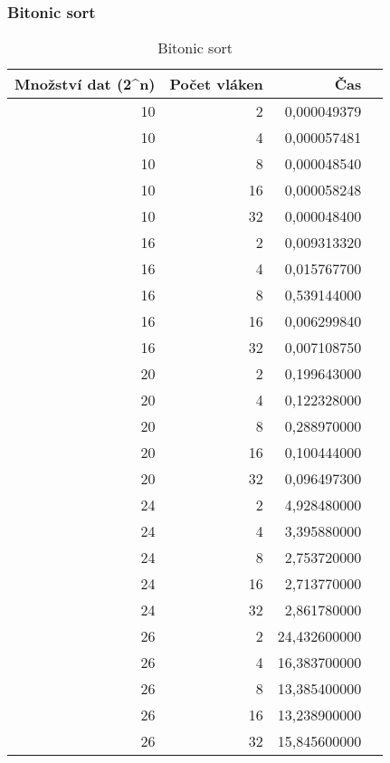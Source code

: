 \documentclass[12pt]{article}
\begin{document}
\subsubsection{Bitonic sort}
\begin{table}[H]
\begin{center}
\begin{tabular}{|r|r|r|r|}
\hline Množství dat (2^n) & Počet vláken & Čas \\ \hline
10 & 2  & 0,000049379 \\ \hline
10 & 4  & 0,000057481 \\ \hline
10 & 8  & 0,000048540 \\ \hline
10 & 16 & 0,000058248 \\ \hline
10 & 32 & 0,000048400 \\ \hline
16 & 2  & 0,009313320 \\ \hline
16 & 4  & 0,015767700 \\ \hline
16 & 8  & 0,539144000 \\ \hline
16 & 16 & 0,006299840 \\ \hline
16 & 32 & 0,007108750 \\ \hline
20 & 2  & 0,199643000 \\ \hline
20 & 4  & 0,122328000 \\ \hline
20 & 8  & 0,288970000 \\ \hline
20 & 16 & 0,100444000 \\ \hline
20 & 32 & 0,096497300 \\ \hline
24 & 2  & 4,928480000 \\ \hline
24 & 4  & 3,395880000 \\ \hline
24 & 8  & 2,753720000 \\ \hline
24 & 16 & 2,713770000 \\ \hline
24 & 32 & 2,861780000 \\ \hline
26 & 2  & 24,432600000 \\ \hline
26 & 4  & 16,383700000 \\ \hline
26 & 8  & 13,385400000 \\ \hline
26 & 16 & 13,238900000 \\ \hline
26 & 32 & 15,845600000 \\ \hline
\end{tabular} 
\end{center}
\caption{Bitonic sort}
\end{table}
\end{document}
